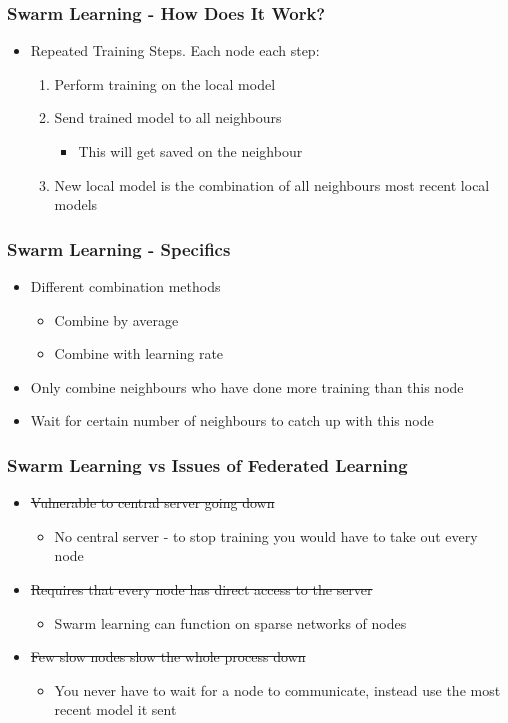 \documentclass{beamer}
\begin{document}
	\begin{frame}
		\frametitle{Swarm Learning - How Does It Work?}
		\begin{itemize}
			\item Repeated Training Steps. Each node each step:
			\begin{enumerate}
				\item Perform training on the local model
				\item Send trained model to all neighbours
				\begin{itemize}
					\item This will get saved on the neighbour
				\end{itemize}
				\item New local model is the combination of all neighbours most recent local models
			\end{enumerate}
		\end{itemize}
	\end{frame}

	\begin{frame}
		\frametitle{Swarm Learning - Specifics}
		\begin{itemize}
			\item Different combination methods
			\begin{itemize}
				\item Combine by average
				\item Combine with learning rate
			\end{itemize}
			\item Only combine neighbours who have done more training than this node
			\item Wait for certain number of neighbours to catch up with this node
		\end{itemize}
	\end{frame}

	\begin{frame}
		\frametitle{Swarm Learning vs Issues of Federated Learning}
		\begin{itemize}
			\item \sout{Vulnerable to central server going down}
			\begin{itemize}
				\item No central server - to stop training you would have to take out every node
			\end{itemize}
			\item \sout{Requires that every node has direct access to the server}
			\begin{itemize}
				\item Swarm learning can function on sparse networks of nodes
			\end{itemize}
			\item \sout{Few slow nodes slow the whole process down}
			\begin{itemize}
				\item You never have to wait for a node to communicate, instead use the most recent model it sent
			\end{itemize}
		\end{itemize}
	\end{frame}
\end{document}
